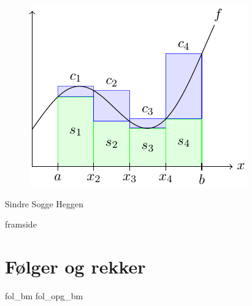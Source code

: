 



\renewcommand*\familydefault{\sfdefault} %

\addto\captionsenglish{\renewcommand{\figurename}{Figur}}
\makeatletter
\addto\captionsenglish{\renewcommand{\chaptername}{Kapittel}}
\addto\captionsenglish{\renewcommand{\contentsname}{Innhold}}



	
	\pagecolor{blue!20}
	
	\begin{titlepage}
		\begin{center}
			\vspace*{1cm}
			
			{}
			
			\vspace{2.45cm} 
			\begin{figure}[H]
				\centering
				\qquad\includegraphics[scale=1.8]{fig/frpg}
			\end{figure}           
			\vspace{2 cm}
			\raggedleft Sindre Sogge Heggen   \end{center}
	\end{titlepage}
	\pagecolor{white}
\newpage
\phantom{}
\thispagestyle{empty}	
\newpage	
{framside}
\newpage

\footnotesize
\tableofcontents
\normalsize
\chapter{Følger og rekker\label{Folgerogrekker}}
\vspace{20pt}
{fol_bm}
\newpage
{fol_opg_bm}

